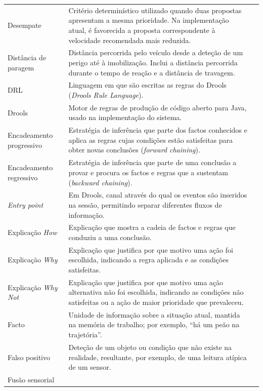 {\begin{longtable}{@{}L{4.4cm}VL{10.0cm}@{}}
  Desempate
    & Critério determinístico utilizado quando duas propostas apresentam a
      mesma prioridade. Na implementação atual, é favorecida a proposta
      correspondente à velocidade recomendada mais reduzida. \\ \linhasep
  Distância de paragem
    & Distância percorrida pelo veículo desde a deteção de um perigo até à
      imobilização. Inclui a distância percorrida durante o tempo de
      reação e a distância de travagem. \\ \linhasep
  DRL
    & Linguagem em que são escritas as regras do Drools (\emph{Drools Rule
      Language}). \\ \linhasep
  Drools
    & Motor de regras de produção de código aberto para Java, usado na
      implementação do sistema. \\ \linhasep
  Encadeamento progressivo
    & Estratégia de inferência que parte dos factos conhecidos e aplica as
      regras cujas condições estão satisfeitas para obter novas conclusões
      (\emph{forward chaining}). \\ \linhasep
  Encadeamento regressivo
    & Estratégia de inferência que parte de uma conclusão a provar e
      procura os factos e regras que a sustentam (\emph{backward
      chaining}). \\ \linhasep
  \emph{Entry point}
    & Em Drools, canal através do qual os eventos são inseridos na sessão,
      permitindo separar diferentes fluxos de informação. \\ \linhasep
  Explicação \emph{How}
    & Explicação que mostra a cadeia de factos e regras que conduziu a uma
      conclusão. \\ \linhasep
  Explicação \emph{Why}
    & Explicação que justifica por que motivo uma ação foi escolhida,
      indicando a regra aplicada e as condições satisfeitas. \\ \linhasep
  Explicação \emph{Why Not}
    & Explicação que justifica por que motivo uma ação alternativa não foi
      escolhida, indicando as condições não satisfeitas ou a ação de maior
      prioridade que prevaleceu. \\ \linhasep
  Facto
    & Unidade de informação sobre a situação atual, mantida na memória de
      trabalho; por exemplo, \enquote{há um peão na trajetória}. \\ \linhasep
  Falso positivo
    & Deteção de um objeto ou condição que não existe na realidade,
      resultante, por exemplo, de uma leitura atípica de um sensor. \\ \linhasep
  Fusão sensorial

\end{longtable}}
